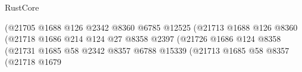 \begin{lexlean}{RustCore}
\begin{coremodule}
                                                              (@21705
                                                                @1688
                                                                @126
                                                                @2342
                                                                @8360
                                                                @6785
                                                                @12525
                                                                (@21713
                                                                  @1688
                                                                  @126
                                                                  @8360
                                                                  (@21718
                                                                    @1686
                                                                    @214
                                                                    @124
                                                                    @27
                                                                    @8358
                                                                    @2397
                                                                    (@21726
                                                                      @1686
                                                                      @124
                                                                      @8358
                                                                      (@21731
                                                                        @1685
                                                                        @58
                                                                        @2342
                                                                        @8357
                                                                        @6788
                                                                        @15339
                                                                        (@21713
                                                                          @1685
                                                                          @58
                                                                          @8357
                                                                          (@21718
                                                                            @1679

\end{coremodule}
\end{lexlean}
